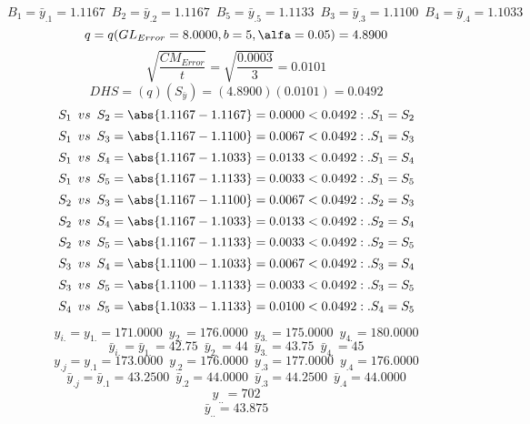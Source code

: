 $$B_{1}=\bar{y}_{.1}=1.1167 \enspace B_{2}=\bar{y}_{.2}=1.1167 \enspace B_{5}=\bar{y}_{.5}=1.1133 \enspace B_{3}=\bar{y}_{.3}=1.1100 \enspace B_{4}=\bar{y}_{.4}=1.1033$$
$$q=q(GL_{Error}=8.0000, b=5, \alfa=0.05)=4.8900$$
$$\sqrt{\frac{CM_{Error}}{t}}=\sqrt{\frac{0.0003}{3}}=0.0101$$
$$DHS=(q)(S_{\bar{y}})=(4.8900)(0.0101)=0.0492$$
$$S_{1} \enspace vs \enspace S_{2} = \abs{1.1167-1.1167}=0.0000<0.0492:.S_{1}=S_{2}$$
$$S_{1} \enspace vs \enspace S_{3} = \abs{1.1167-1.1100}=0.0067<0.0492:.S_{1}=S_{3}$$
$$S_{1} \enspace vs \enspace S_{4} = \abs{1.1167-1.1033}=0.0133<0.0492:.S_{1}=S_{4}$$
$$S_{1} \enspace vs \enspace S_{5} = \abs{1.1167-1.1133}=0.0033<0.0492:.S_{1}=S_{5}$$
$$S_{2} \enspace vs \enspace S_{3} = \abs{1.1167-1.1100}=0.0067<0.0492:.S_{2}=S_{3}$$
$$S_{2} \enspace vs \enspace S_{4} = \abs{1.1167-1.1033}=0.0133<0.0492:.S_{2}=S_{4}$$
$$S_{2} \enspace vs \enspace S_{5} = \abs{1.1167-1.1133}=0.0033<0.0492:.S_{2}=S_{5}$$
$$S_{3} \enspace vs \enspace S_{4} = \abs{1.1100-1.1033}=0.0067<0.0492:.S_{3}=S_{4}$$
$$S_{3} \enspace vs \enspace S_{5} = \abs{1.1100-1.1133}=0.0033<0.0492:.S_{3}=S_{5}$$
$$S_{4} \enspace vs \enspace S_{5} = \abs{1.1033-1.1133}=0.0100<0.0492:.S_{4}=S_{5}$$









$$y_{i.}=y_{1.}=171.0000 \enspace y_{2.}=176.0000 \enspace y_{3.}=175.0000 \enspace y_{4.}=180.0000$$
$$\bar{y}_{i.}=\bar{y}_{1.}=42.75 \enspace \bar{y}_{2.}=44 \enspace \bar{y}_{3.}=43.75 \enspace \bar{y}_{4.}=45$$
$$y_{.j}=y_{.1}=173.0000 \enspace y_{.2}=176.0000 \enspace y_{.3}=177.0000 \enspace y_{.4}=176.0000$$
$$\bar{y}_{.j}=\bar{y}_{.1}=43.2500 \enspace \bar{y}_{.2}=44.0000 \enspace \bar{y}_{.3}=44.2500 \enspace \bar{y}_{.4}=44.0000$$
$$y_{..}=702$$
$$\bar{y}_{..}=43.875$$

